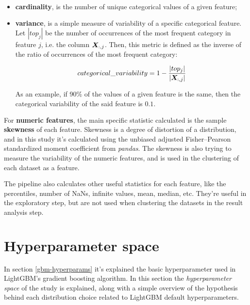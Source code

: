 \begin{itemize}
    \item \textbf{cardinality}, is the number of unique categorical values of a given feature;
    \item \textbf{variance}, is  a simple measure of variability of a specific categorical feature.
    Let $|top_{j}|$ be the number of occurrences of the most frequent category in feature $j$, i.e. the column $\bm{X}_{:, j}$. Then, this metric is defined as the inverse of the ratio of occurrences of the most frequent category:

    $$categorical\_variability=1 - \frac{|top_{j}|}{|\bm{X}_{:, j}|}$$

    As an example, if 90\% of the values of a given feature is the same, then the categorical variability of the said feature is $0.1$.
\end{itemize}

For \textbf{numeric features}, the main specific statistic calculated is the sample \textbf{skewness} of each feature. Skewness is a degree of distortion of a distribution, and in this study it's calculated using the unbiased adjusted Fisher–Pearson standardized moment coefficient from \textit{pandas}. The skewness is also trying to measure the variability of the numeric features, and is used in the clustering of each dataset as a feature.

The pipeline also calculates other useful statistics for each feature, like the percentiles, number of NaNs, infinite values, mean, median, etc. They're useful in the exploratory step, but are not used when clustering the datasets in the result analysis step.

\section{Hyperparameter space}

In section \ref{gbm-hyperparams} it's explained the basic hyperparameter used in LightGBM's gradient boosting algorithm. In this section the \textit{hyperparameter space} of the study is explained, along with a simple overview of the hypothesis behind each distribution choice related to LightGBM default hyperparameters.